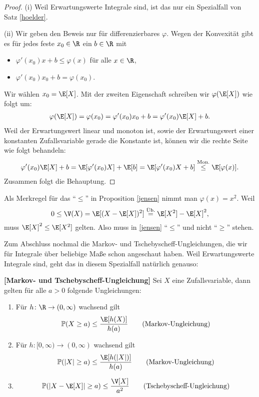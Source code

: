 \begin{proof}
(i) Weil Erwartungswerte Integrale sind, ist das nur ein Spezialfall von Satz \ref{hoelder}.\smallskip

(ii) Wir geben den Beweis nur f\"ur differenzierbares $\varphi$. Wegen der Konvexität gibt es f\"ur jedes feste $x_0 \in \R$ ein $b\in\R$ mit
	\begin{itemize}
		\item $ \varphi'(x_0) x + b \leq \varphi(x)$ f\"ur alle $x\in\R$,
		\item $ \varphi'(x_0) x_0 + b = \varphi(x_0)$.
	\end{itemize}
	Wir w\"ahlen $x_0 = \E[X]$. Mit der zweiten Eigenschaft schreiben wir $\varphi(\E[X])$ wie folgt um:
	\begin{align*}
	\varphi(\E[X]) = \varphi(x_0) = \varphi'(x_0) x_0 + b = \varphi'(x_0) \E[X] + b.
	\end{align*}
	Weil der Erwartungswert linear und monoton ist, sowie der Erwartungswert einer konstanten Zufallsvariable gerade die Konstante ist, k\"onnen wir die rechte Seite wie folgt behandeln:
	\begin{align*}	
	\varphi'(x_0) \E[X] + b= \E[\varphi'(x_0) X] + \E[b] = \E[\varphi'(x_0) X + b] \overset{\text{Mon.}}{\leq} \E[\varphi(x)].
	\end{align*}
	Zusammen folgt die Behauptung.
\end{proof}

\begin{beispiel1}
	Als Merkregel für das \enquote{$\leq$} in Proposition \ref{jensen} nimmt man $\varphi(x)=x^2$. Weil
	\[ 0 \leq \V(X) = \E[(X - \E[X])^2] \overset{\text{Üb.}}{=} \E[X^2] - \E[X]^2,
	\]
	muss $\E[X]^2\leq \E[X^2]$ gelten. Also muss in \ref{jensen} \enquote{$\leq$} und nicht \enquote{$\geq$} stehen.
\end{beispiel1}
\marginpar{\textcolor{red}{Vorlesung 19}}
Zum Abschluss nochmal die Markov- und Tschebyscheff-Ungleichungen, die wir f\"ur Integrale \"uber beliebige Ma\ss e schon angeschaut haben. Weil Erwartungswerte Integrale sind, geht das in diesem Spezialfall nat\"urlich genauso:
\begin{satz}\label{Markov}
 \textbf{[Markov- und Tschebyscheff-Ungleichung]}
	Sei $X$ eine Zufallsvariable, dann gelten für alle $a > 0$ folgende Ungleichungen:
	\begin{enumerate}[label=(\roman*)]
		\item F\"ur $h \colon \R \to (0, \infty)$ wachsend gilt
		 \[ \mathbb{P}(X\geq a) \leq \frac{\E[h(X)]}{h(a)} \quad\quad \text{(Markov-Ungleichung)} \]
		\item F\"ur $h \colon [0,\infty) \to (0, \infty)$ wachsend gilt		
		 \[ \mathbb{P}(|X|\geq a) \leq \frac{\E[h(|X|)]}{h(a)} \quad\quad \text{(Markov-Ungleichung)} \]
		\item \[ \mathbb{P}(|X - \E[X]| \geq  a) \leq \frac{\V[X]}{a^2} \quad\quad \text{(Tschebyscheff-Ungleichung)} \]
	\end{enumerate}
\end{satz}

